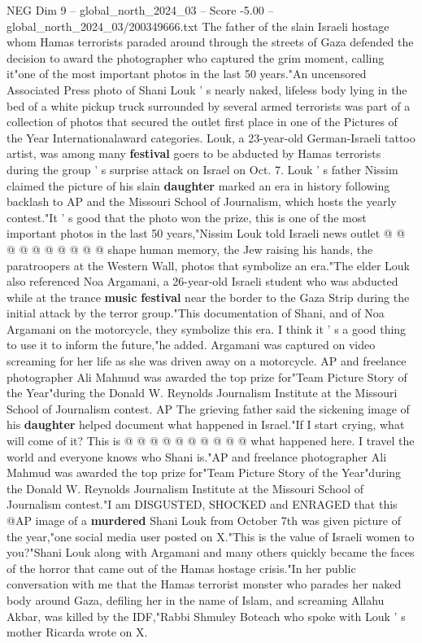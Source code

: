 \begin{textsample}{NEG Dim 9 – global\_north\_2024\_03 – Score -5.00 – global\_north\_2024\_03/200349666.txt}  \label{ex:f9_neg_249}
The father of the slain Israeli hostage whom Hamas terrorists paraded around through the streets of Gaza defended the decision to award the photographer who captured the grim moment, calling it"one of the most important photos in the last 50 years."An uncensored Associated Press photo of Shani Louk ' s nearly naked, lifeless body lying in the bed of a white pickup truck surrounded by several armed terrorists was part of a collection of photos that secured the outlet first place in one of the Pictures of the Year Internationalaward categories.
Louk, a 23-year-old German-Israeli tattoo artist, was among many \textbf{festival} goers to be abducted by Hamas terrorists during the group ' s surprise attack on Israel on Oct. 7.
Louk ' s father Nissim claimed the picture of his slain \textbf{daughter} marked an era in history following backlash to AP and the Missouri School of Journalism, which hosts the yearly contest."It ' s good that the photo won the prize, this is one of the most important photos in the last 50 years,"Nissim Louk told Israeli news outlet @ @ @ @ @ @ @ @ @ @ shape human memory, the Jew raising his hands, the paratroopers at the Western Wall, photos that symbolize an era."The elder Louk also referenced Noa Argamani, a 26-year-old Israeli student who was abducted while at the trance \textbf{music} \textbf{festival} near the border to the Gaza Strip during the initial attack by the terror group."This documentation of Shani, and of Noa Argamani on the motorcycle, they symbolize this era.
I think it ' s a good thing to use it to inform the future,"he added.
Argamani was captured on video screaming for her life as she was driven away on a motorcycle.
AP and freelance photographer Ali Mahmud was awarded the top prize for"Team Picture Story of the Year"during the Donald W.
Reynolds Journalism Institute at the Missouri School of Journalism contest.
AP The grieving father said the sickening image of his \textbf{daughter} helped document what happened in Israel."If I start crying, what will come of it?
This is @ @ @ @ @ @ @ @ @ @ what happened here.
I travel the world and everyone knows who Shani is."AP and freelance photographer Ali Mahmud was awarded the top prize for"Team Picture Story of the Year"during the Donald W.
Reynolds Journalism Institute at the Missouri School of Journalism contest."I am DISGUSTED, SHOCKED and ENRAGED that this @AP image of a \textbf{murdered} Shani Louk from October 7th was given picture of the year,"one social media user posted on X."This is the value of Israeli women to you?"Shani Louk along with Argamani and many others quickly became the faces of the horror that came out of the Hamas hostage crisis."In her public conversation with me that the Hamas terrorist monster who parades her naked body around Gaza, defiling her in the name of Islam, and screaming Allahu Akbar, was killed by the IDF,"Rabbi Shmuley Boteach who spoke with Louk ' s mother Ricarda wrote on X.

\end{textsample}
